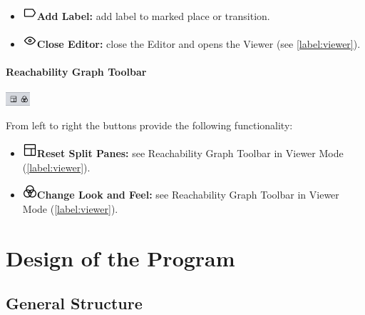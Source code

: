 \documentclass[10pt, a4paper]{article}
\begin{document}
\begin{itemize}
\item\includegraphics[scale=0.4]{../src/resources/images/Toolbar/label.png}\hspace{0.1cm}\textbf{Add Label:} add label to marked place or transition.
\item\includegraphics[scale=0.4]{../src/resources/images/Toolbar/eye.png}\hspace{0.1cm}\textbf{Close Editor:} close the Editor and opens the Viewer (see \ref{label:viewer}).
\end{itemize}


\paragraph{Reachability Graph Toolbar}

\includegraphics[height=0.5cm]{Editor_Reachability.png}

From left to right the buttons provide the following functionality:
\begin{itemize}
\item\includegraphics[scale=0.4]{../src/resources/images/Toolbar/layout.png}\hspace{0.1cm}\textbf{Reset Split Panes:} see Reachability Graph Toolbar in Viewer Mode (\ref{label:viewer}).
\item\includegraphics[scale=0.4]{../src/resources/images/Toolbar/design.png}\hspace{0.1cm}\textbf{Change Look and Feel:} see Reachability Graph Toolbar in Viewer Mode (\ref{label:viewer}).
\end{itemize}

\section{Design of the Program}


\subsection{General Structure}
\end{document}
